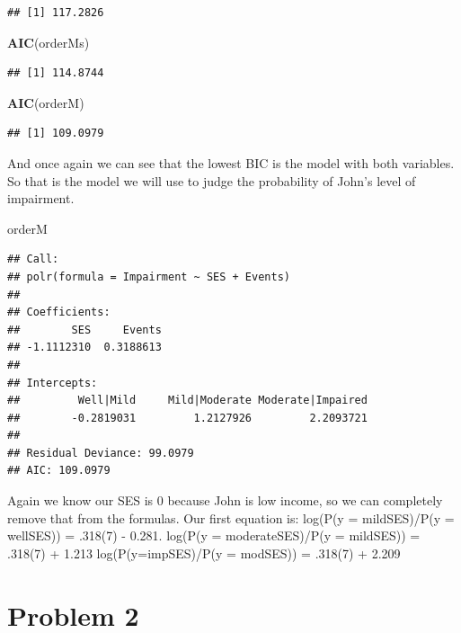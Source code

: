 \documentclass[
]{article}
\newenvironment{Shaded}{\begin{snugshade}}{\end{snugshade}}
\newcommand{\FunctionTok}[1]{\textcolor[rgb]{0.13,0.29,0.53}{\textbf{#1}}}
\newcommand{\NormalTok}[1]{#1}
\begin{document}
\begin{verbatim}
## [1] 117.2826
\end{verbatim}

\begin{Shaded}
\begin{Highlighting}[]
\FunctionTok{AIC}\NormalTok{(orderMs)}
\end{Highlighting}
\end{Shaded}

\begin{verbatim}
## [1] 114.8744
\end{verbatim}

\begin{Shaded}
\begin{Highlighting}[]
\FunctionTok{AIC}\NormalTok{(orderM)}
\end{Highlighting}
\end{Shaded}

\begin{verbatim}
## [1] 109.0979
\end{verbatim}

And once again we can see that the lowest BIC is the model with both
variables. So that is the model we will use to judge the probability of
John's level of impairment.

\begin{Shaded}
\begin{Highlighting}[]
\NormalTok{orderM}
\end{Highlighting}
\end{Shaded}

\begin{verbatim}
## Call:
## polr(formula = Impairment ~ SES + Events)
## 
## Coefficients:
##        SES     Events 
## -1.1112310  0.3188613 
## 
## Intercepts:
##         Well|Mild     Mild|Moderate Moderate|Impaired 
##        -0.2819031         1.2127926         2.2093721 
## 
## Residual Deviance: 99.0979 
## AIC: 109.0979
\end{verbatim}

Again we know our SES is 0 because John is low income, so we can
completely remove that from the formulas. Our first equation is: log(P(y
= mild\textbar SES)/P(y = well\textbar SES)) = .318(7) - 0.281. log(P(y
= moderate\textbar SES)/P(y = mild\textbar SES)) = .318(7) + 1.213
log(P(y=imp\textbar SES)/P(y = mod\textbar SES)) = .318(7) + 2.209

\section{Problem 2}\label{problem-2}
\end{document}
